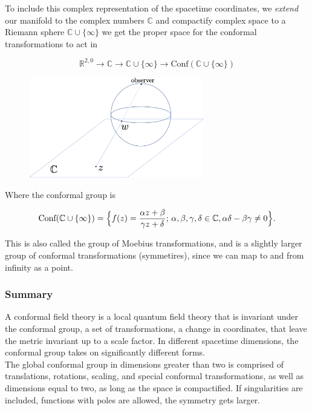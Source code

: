 \noindent To include this complex representation of the spacetime coordinates, we \textit{extend} our manifold to the complex numbers $\mathbb{C}$ and compactify complex space to a Riemann sphere $\mathbb{C} \cup \{ \infty \}$ we get the proper space for the conformal transformations to act in

\begin{equation}
\mathbb{R}^{2,0} \rightarrow \mathbb{C} \rightarrow \mathbb{C} \cup \{\infty\} \rightarrow \text{Conf}(\mathbb{C} \cup \{\infty\} )
\end{equation}

\begin{figure}[H]
	\centering
	\includegraphics[width=3in]{images/riemann_sphere.png} 
\end{figure} 

\noindent Where the conformal group is

\begin{equation}
\text{Conf}(\mathbb{C} \cup \{ \infty \} ) = \Big{\{} f(z) = \frac{\alpha z + \beta}{\gamma z + \delta}; \, \alpha, \beta, \gamma, \delta \in \mathbb{C}, \alpha\delta - \beta \gamma \ne 0 \Big{\}}.
\end{equation}

\noindent This is also called the group of Moebius transformations, and is a slightly larger group of conformal transformations (symmetires), since we can map to and from infinity as a point. \\

\subsubsection*{Summary}

\noindent A conformal field theory is a local quantum field theory that is invariant under the conformal group, a set of transformations, a change in coordinates, that leave the metric invariant up to a scale factor. In different spacetime dimensions, the conformal group takes on significantly different forms. \\

\noindent The global conformal group in dimensions greater than two is comprised of translations, rotations, scaling, and special conformal transformations, as well as dimensions equal to two, as long as the space is compactified. If singularities are included, functions with poles are allowed, the symmetry gets larger.